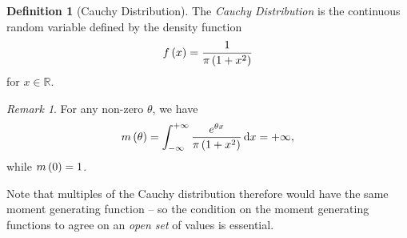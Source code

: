 \documentclass{article}
\theoremstyle{definition}
\newtheorem{definition}[theorem]{Definition}
\theoremstyle{remark}
\newtheorem{remark}[theorem]{Remark}
\newcommand{\RR}{\mathbb{R}}
\newcommand{\plusinfty}{+\infty}
\newcommand{\minusinfty}{-\infty}
\begin{document}
\begin{definition}[Cauchy Distribution]
    The \emph{Cauchy Distribution} is the continuous random variable defined by the density function
    \[
        f\left(x\right) = \frac{1}{\pi \left(1 + x^2\right)}
    \]
    for \(x \in \RR\).
\end{definition}

\begin{remark}
    For any non-zero \(\theta\), we have
    \[
        m\pqty{\theta} = \int_{\minusinfty}^{\plusinfty} \frac{e^{\theta x}}{\pi \pqty{1 + x^2}} \dd{x} = \plusinfty,
    \]
    while \(m\left(0\right) = 1\).
\end{remark}

Note that multiples of the Cauchy distribution therefore would have the same moment generating function -- so the condition on the moment generating functions to agree on an \emph{open set} of values is essential.
\end{document}
